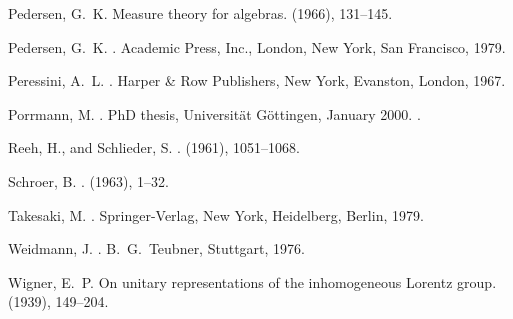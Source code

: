 \documentclass[a4paper,a4paper]{article}
\numberwithin{equation}{section}
\theoremstyle{definition}
\theoremstyle{plain}
\theoremstyle{remark}
\begin{document}
\begin{thebibliography}{10}
{\sc Pedersen, G.~K.}
\newblock Measure theory for {\coordHE{}} algebras.
 (1966), 131--145.

{\sc Pedersen, G.~K.}
.
\newblock Academic Press, Inc., London, New York, San Francisco, 1979.

{\sc Peressini, A.~L.}
.
\newblock Harper \& Row Publishers, New York, Evanston, London, 1967.

{\sc Porrmann, M.}
.
\newblock PhD thesis, Universit\"at G\"ottingen, January 2000.
.

{\sc Reeh, H., and Schlieder, S.}
.
 (1961), 1051--1068.

{\sc Schroer, B.}
.
 (1963), 1--32.

{\sc Takesaki, M.}
.
\newblock Springer-Verlag, New York, Heidelberg, Berlin, 1979.

{\sc Weidmann, J.}
.
\newblock B.~G.~Teubner, Stuttgart, 1976.

{\sc Wigner, E.~P.}
\newblock On unitary representations of the inhomogeneous {Lorentz} group.
 (1939), 149--204.

\end{thebibliography}
  
\end{document}
